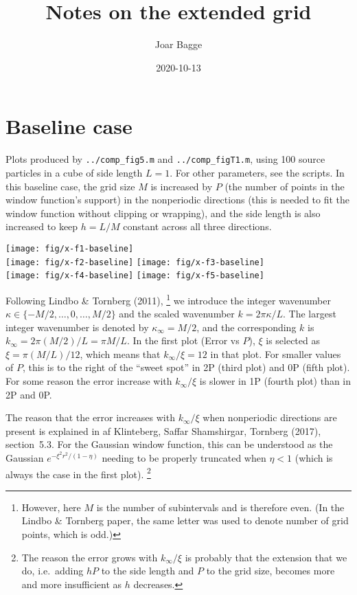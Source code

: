 \documentclass[a4paper,10pt]{article}
\title{Notes on the extended grid}
\author{Joar Bagge}
\date{2020-10-13}
\begin{document}
\maketitle

\section{Baseline case}

Plots produced by \verb|../comp_fig5.m| and \verb|../comp_figT1.m|,
using 100 source particles in a cube of side length $L=1$. For
other parameters, see the scripts. In this baseline case, the
grid size $M$ is increased by $P$ (the number of points in the
window function's support) in the nonperiodic directions (this is
needed to fit the window function without clipping or wrapping),
and the side length is also increased to keep $h=L/M$ constant
across all three directions.

{\noindent\centering
\texttt{[image: fig/x-f1-baseline]}\\%
\texttt{[image: fig/x-f2-baseline]}%
\texttt{[image: fig/x-f3-baseline]}\\%
\texttt{[image: fig/x-f4-baseline]}%
\texttt{[image: fig/x-f5-baseline]}}

Following Lindbo \& Tornberg (2011),%
\footnote{However, here $M$ is the number of subintervals and is
therefore even. (In the Lindbo \& Tornberg paper, the same letter
was used to denote number of grid points, which is odd.)}
we introduce the integer wavenumber $\kappa \in \{ -M/2, \ldots,
0, \ldots, M/2\}$ and the scaled wavenumber $k = 2\pi \kappa /
L$. The largest integer wavenumber is denoted by
$\kappa_\infty = M/2$, and the corresponding $k$ is $k_\infty =
2\pi (M/2)/L = \pi M / L$. In the first plot (Error vs $P$),
$\xi$ is selected as $\xi = \pi (M/L) / 12$, which means that
$k_\infty / \xi = 12$ in that plot. For smaller values of $P$,
this is to the right of the ``sweet spot'' in 2P (third plot) and
0P (fifth plot). For some reason the error increase with
$k_\infty/\xi$ is slower in 1P (fourth plot) than in 2P and 0P.

The reason that the error increases with $k_\infty/\xi$ when
nonperiodic directions are present is explained in af Klinteberg,
Saffar Shamshirgar, Tornberg (2017), section~5.3. For the
Gaussian window function, this can be understood as the Gaussian
$e^{-\xi^2r^2/(1-\eta)}$ needing to be properly truncated when
$\eta < 1$ (which is always the case in the first plot).%
\footnote{The reason the error grows with $k_\infty/\xi$ is
probably that the extension that we do, i.e.\ adding $hP$ to the
side length and $P$ to the grid size, becomes more and more
insufficient as $h$ decreases.}
\end{document}
